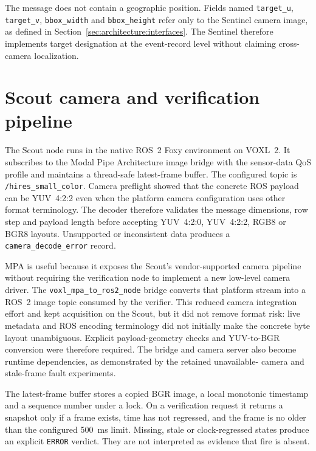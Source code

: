 The message does not contain a geographic position. Fields named
\texttt{target\_u}, \texttt{target\_v}, \texttt{bbox\_width} and
\texttt{bbox\_height} refer only to the Sentinel camera image, as defined in
Section~\ref{sec:architecture:interfaces}. The Sentinel therefore implements
target designation at the event-record level without claiming cross-camera
localization.

\section{Scout camera and verification pipeline}
\label{sec:implementation:scout}

The Scout node runs in the native ROS~2 Foxy environment on VOXL~2. It
subscribes to the Modal Pipe Architecture image bridge with the sensor-data QoS
profile and maintains a thread-safe latest-frame buffer. The configured topic
is \texttt{/hires\_small\_color}. Camera preflight showed that the concrete ROS
payload can be YUV~4:2:2 even when the platform camera configuration uses other
format terminology. The decoder therefore validates the message dimensions,
row step and payload length before accepting YUV~4:2:0, YUV~4:2:2, RGB8 or
BGR8 layouts. Unsupported or inconsistent data produces a
\texttt{camera\_decode\_error} record.

MPA is useful because it exposes the Scout's vendor-supported camera pipeline
without requiring the verification node to implement a new low-level camera
driver. The \texttt{voxl\_mpa\_to\_ros2\_node} bridge converts that platform
stream into a ROS~2 image topic consumed by the verifier. This reduced camera
integration effort and kept acquisition on the Scout, but it did not remove
format risk: live metadata and ROS encoding terminology did not initially make
the concrete byte layout unambiguous. Explicit payload-geometry checks and
YUV-to-BGR conversion were therefore required. The bridge and camera server
also become runtime dependencies, as demonstrated by the retained unavailable-
camera and stale-frame fault experiments.

The latest-frame buffer stores a copied BGR image, a local monotonic timestamp
and a sequence number under a lock. On a verification request it returns a
snapshot only if a frame exists, time has not regressed, and the frame is no
older than the configured 500~ms limit. Missing, stale or clock-regressed
states produce an explicit \texttt{ERROR} verdict. They are not interpreted as
evidence that fire is absent.


